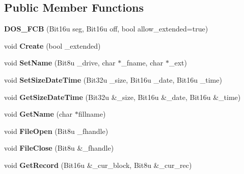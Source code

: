 \subsection*{Public Member Functions}
\begin{DoxyCompactItemize}
\item 
\hypertarget{classDOS__FCB_ab319f54fa348ba7ec8ec31f0be35ffd7}{{\bfseries D\-O\-S\-\_\-\-F\-C\-B} (Bit16u seg, Bit16u off, bool allow\-\_\-extended=true)}\label{classDOS__FCB_ab319f54fa348ba7ec8ec31f0be35ffd7}

\item 
\hypertarget{classDOS__FCB_af0cb47f3b62e13768e6e60f54da03cb4}{void {\bfseries Create} (bool \-\_\-extended)}\label{classDOS__FCB_af0cb47f3b62e13768e6e60f54da03cb4}

\item 
\hypertarget{classDOS__FCB_a1391992d0ed51c37dd6828c91c53f9b1}{void {\bfseries Set\-Name} (Bit8u \-\_\-drive, char $\ast$\-\_\-fname, char $\ast$\-\_\-ext)}\label{classDOS__FCB_a1391992d0ed51c37dd6828c91c53f9b1}

\item 
\hypertarget{classDOS__FCB_ac918ad0a449940524b2f81a56157a957}{void {\bfseries Set\-Size\-Date\-Time} (Bit32u \-\_\-size, Bit16u \-\_\-date, Bit16u \-\_\-time)}\label{classDOS__FCB_ac918ad0a449940524b2f81a56157a957}

\item 
\hypertarget{classDOS__FCB_a34bd6b8d681c90c1839edf5e11a45c5a}{void {\bfseries Get\-Size\-Date\-Time} (Bit32u \&\-\_\-size, Bit16u \&\-\_\-date, Bit16u \&\-\_\-time)}\label{classDOS__FCB_a34bd6b8d681c90c1839edf5e11a45c5a}

\item 
\hypertarget{classDOS__FCB_ae0acbf219f3acd38ea345a9bd7d3d1d7}{void {\bfseries Get\-Name} (char $\ast$fillname)}\label{classDOS__FCB_ae0acbf219f3acd38ea345a9bd7d3d1d7}

\item 
\hypertarget{classDOS__FCB_a891b22e2889cdb34a3d1c9410328d17e}{void {\bfseries File\-Open} (Bit8u \-\_\-fhandle)}\label{classDOS__FCB_a891b22e2889cdb34a3d1c9410328d17e}

\item 
\hypertarget{classDOS__FCB_a538abc0ea3fee9715173dd1bc1d8951a}{void {\bfseries File\-Close} (Bit8u \&\-\_\-fhandle)}\label{classDOS__FCB_a538abc0ea3fee9715173dd1bc1d8951a}

\item 
\hypertarget{classDOS__FCB_ad7e60e5dae86e9ff4cedd4ec7e7e0172}{void {\bfseries Get\-Record} (Bit16u \&\-\_\-cur\-\_\-block, Bit8u \&\-\_\-cur\-\_\-rec)}\label{classDOS__FCB_ad7e60e5dae86e9ff4cedd4ec7e7e0172}


\end{DoxyCompactItemize}
